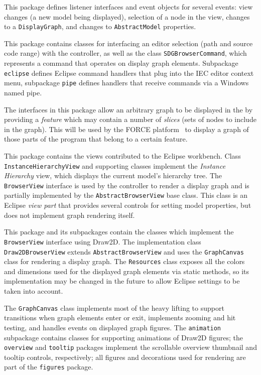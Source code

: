 \begin{description}
   This package defines listener interfaces and event objects for several events: view changes (a new 
  model being displayed), selection of a node in the view, changes to a \lstinline|DisplayGraph|, and changes to 
  \lstinline|AbstractModel| properties.
  
   This package contains classes for interfacing an editor selection (path and source code range) with 
  the \SB controller, as well as the class \lstinline|SDGBrowserCommand|, which represents a command that operates on 
  display graph elements. Subpackage \lstinline|eclipse| defines Eclipse command handlers that plug into the IEC editor 
  context menu, subpackage \lstinline|pipe| defines handlers that receive commands via a Windows named pipe.
  
   The interfaces in this package allow an arbitrary graph to be displayed in the \SB by 
  providing a \emph{feature} which may contain a number of \emph{slices} (sets of nodes to include in the graph). This 
  will be used by the FORCE platform~\cite{HinterreiterDA} to display a graph of those parts of the program that belong 
  to a certain feature.
  
   This package contains the views contributed to the Eclipse workbench. Class 
  \lstinline|InstanceHierarchyView| and supporting classes implement the \emph{Instance Hierarchy} view, which displays 
  the current model's hierarchy tree. The \lstinline|BrowserView| interface is used by the controller to render a 
  display graph and is partially implemented by the \lstinline|AbstractBrowserView| base class. This class is an 
  Eclipse \emph{view part} that provides several controls for setting model properties, but does not implement graph 
  rendering itself.
  
   This package and its subpackages contain the classes which implement the 
  \lstinline|BrowserView| interface using Draw2D\footnotemark{}. The implementation class \lstinline|Draw2DBrowserView| 
  extends \lstinline|AbstractBrowserView| and uses the \lstinline|GraphCanvas| class for rendering a display graph. The 
  \lstinline|Resources| class exposes all the colors and dimensions used for the displayed graph elements via static 
  methods, so its implementation may be changed in the future to allow Eclipse settings to be taken into account.
  
  
  The \lstinline|GraphCanvas| class implements most of the heavy lifting to support transitions when graph elements 
  enter or exit, implements zooming and hit testing, and handles events on displayed graph figures. The 
  \lstinline|animation| subpackage contains classes for supporting animations of Draw2D figures; the 
  \lstinline|overview| and \lstinline|tooltip| packages implement the scrollable overview thumbnail and tooltip 
  controls, respectively; all figures and decorations used for rendering are part of the \lstinline|figures| package.
\end{description}


